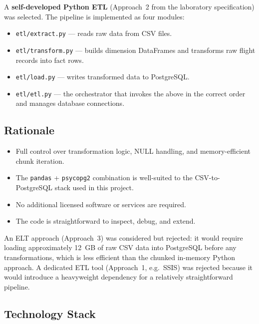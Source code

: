 \documentclass[12pt,a4paper]{article}
\begin{document}
A \textbf{self-developed Python ETL} (Approach~2 from the laboratory
specification) was selected. The pipeline is implemented as four modules:

\begin{itemize}
    \item \texttt{etl/extract.py} — reads raw data from CSV files.
    \item \texttt{etl/transform.py} — builds dimension DataFrames and
          transforms raw flight records into fact rows.
    \item \texttt{etl/load.py} — writes transformed data to PostgreSQL.
    \item \texttt{etl/etl.py} — the orchestrator that invokes the above
          in the correct order and manages database connections.
\end{itemize}

\subsection{Rationale}

\begin{itemize}
    \item Full control over transformation logic, NULL handling, and
          memory-efficient chunk iteration.
    \item The \texttt{pandas} + \texttt{psycopg2} combination is well-suited
          to the CSV-to-PostgreSQL stack used in this project.
    \item No additional licensed software or services are required.
    \item The code is straightforward to inspect, debug, and extend.
\end{itemize}

An ELT approach (Approach~3) was considered but rejected: it would require
loading approximately 12~GB of raw CSV data into PostgreSQL before any
transformations, which is less efficient than the chunked in-memory Python
approach. A dedicated ETL tool (Approach~1, e.g.\ SSIS) was rejected because
it would introduce a heavyweight dependency for a relatively straightforward
pipeline.

\subsection{Technology Stack}
\end{document}
